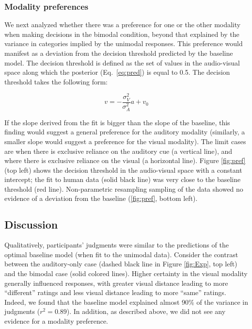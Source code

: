\documentclass[10pt,letterpaper]{article}
\begin{document}
\subsubsection{Modality preferences}

We next analyzed whether there was a preference for one or the other modality when making decisions in the bimodal condition, beyond that explained by the variance in categories implied by the unimodal responses. This preference would manifest as a deviation from the decision threshold predicted by the baseline model. The decision threshold is defined as the set of values in the audio-visual space along which the posterior (Eq.~\ref{eq:pred}) is equal to 0.5. The decision threshold takes the following form:

\begin{equation}
v=-\frac{\sigma^2_V}{\sigma^2_A}a+v_0
\label{eq:threshold}
\end{equation}

If the slope derived from the fit is bigger than the slope of the baseline, this finding would suggest a general preference for the auditory modality (similarly, a smaller slope would suggest a preference for the visual modality). The limit cases are when there is exclusive reliance on the auditory cue (a vertical line), and where there is exclusive reliance on the visual (a horizontal line). Figure \ref{fig:pref} (top left) shows the decision threshold in the audio-visual space with a constant intercept; the fit to human data  (solid black line) was very close to the baseline threshold (red line). Non-parametric resampling sampling of the data showed no evidence of a deviation from the baseline (\ref{fig:pref}, bottom left).

\subsection{Discussion}

Qualitatively, participants' judgments were similar to the predictions of the optimal baseline model (when fit to the unimodal data). Consider the contrast between the auditory-only case (dashed black line in Figure \ref{fig:Exp}, top left) and the bimodal case (solid colored lines).  Higher certainty in the visual modality generally influenced responses, with greater visual distance leading to more ``different'' ratings and less visual distance leading to more ``same'' ratings. Indeed, we found that the baseline model explained almost 90\% of the variance in judgments ($r^2=0.89$). In addition, as described above, we did not see any evidence for a modality preference.
\end{document}

